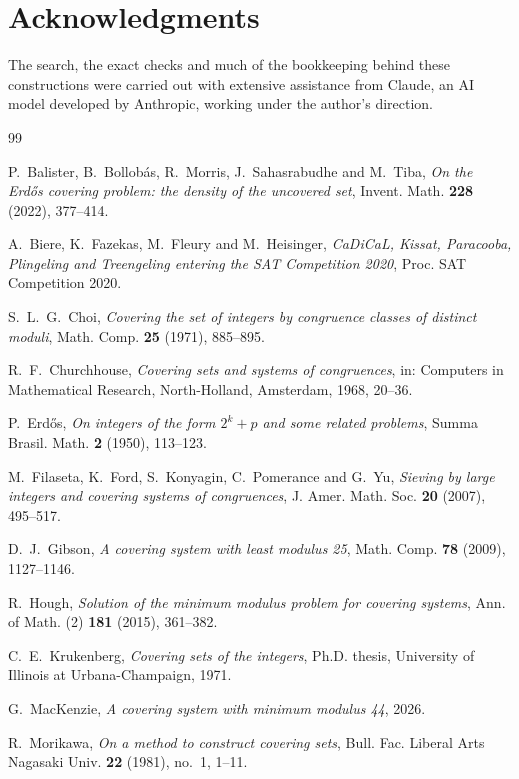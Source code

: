 \documentclass[11pt]{amsart}
\theoremstyle{definition}
\theoremstyle{remark}
\begin{document}
\section*{Acknowledgments}
The search, the exact checks and much of the bookkeeping behind these constructions were carried out with extensive
assistance from Claude, an AI model developed by Anthropic, working under the author's direction.

\begin{thebibliography}{99}

 P.~Balister, B.~Bollobás, R.~Morris, J.~Sahasrabudhe and M.~Tiba, \emph{On the Erdős covering
problem: the density of the uncovered set}, Invent. Math. \textbf{228} (2022), 377--414.

 A.~Biere, K.~Fazekas, M.~Fleury and M.~Heisinger, \emph{CaDiCaL, Kissat, Paracooba, Plingeling and
Treengeling entering the SAT Competition 2020}, Proc. SAT Competition 2020.

 S.~L.~G.~Choi, \emph{Covering the set of integers by congruence classes of distinct moduli}, Math.
Comp. \textbf{25} (1971), 885--895.

 R.~F.~Churchhouse, \emph{Covering sets and systems of congruences}, in: Computers in
Mathematical Research, North-Holland, Amsterdam, 1968, 20--36.

 P.~Erdős, \emph{On integers of the form $2^k+p$ and some related problems}, Summa Brasil. Math.
\textbf{2} (1950), 113--123.

 M.~Filaseta, K.~Ford, S.~Konyagin, C.~Pomerance and G.~Yu, \emph{Sieving by large integers and
covering systems of congruences}, J. Amer. Math. Soc. \textbf{20} (2007), 495--517.

 D.~J.~Gibson, \emph{A covering system with least modulus 25}, Math. Comp. \textbf{78} (2009),
1127--1146.

 R.~Hough, \emph{Solution of the minimum modulus problem for covering systems}, Ann. of Math. (2)
\textbf{181} (2015), 361--382.

 C.~E.~Krukenberg, \emph{Covering sets of the integers}, Ph.D. thesis, University of Illinois
at Urbana-Champaign, 1971.

 G.~MacKenzie, \emph{A covering system with minimum modulus 44}, 2026.

 R.~Morikawa, \emph{On a method to construct covering sets}, Bull. Fac. Liberal Arts Nagasaki
Univ. \textbf{22} (1981), no.~1, 1--11.


\end{thebibliography}
\end{document}
